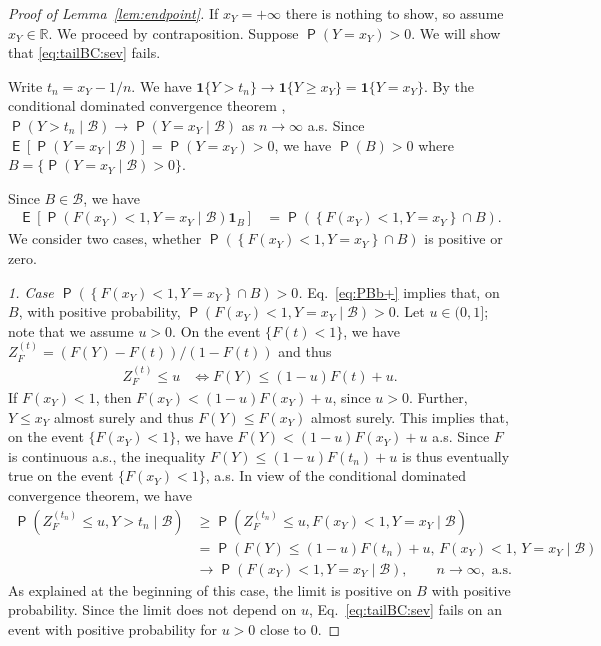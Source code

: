 \documentclass[12pt]{article}
\newcommand{\E}{\operatorname{\mathsf{E}}}
\newcommand{\Q}{\operatorname{\mathsf{P}}}
\newcommand{\R}{\mathbb{R}}
\newcommand{\Bb}{\mathcal{B}}
\newcommand{\1}{\mathbf{1}} %
\newcommand{\ZFt}{Z_{F}^{(t)}} %
\newcommand{\ZFtn}{Z_F^{(t_n)}}
\theoremstyle{definition}
\begin{document}
\begin{proof}[Proof of Lemma~\ref{lem:endpoint}]
	If $x_Y = +\infty$ there is nothing to show, so assume $x_Y \in \R$. We proceed by contraposition. Suppose $\Q(Y = x_Y) > 0$. 
	We will show that \eqref{eq:tailBC:sev} fails.

	Write $t_n = x_Y - 1/n$.
	We have $\1\{Y > t_n\} \to \1\{Y \ge x_Y\} = \1\{Y = x_Y\}$. By the conditional dominated convergence theorem \citep[e.g.][Exercise~8 on page~117]{kallenberg2002foundations}, $\Q(Y > t_n \mid \Bb) \to \Q(Y = x_Y \mid \Bb)$ as $n \to \infty$ a.s.
	Since $\E[\Q(Y = x_Y \mid \Bb)] = \Q(Y = x_Y) > 0$, we have
	$\Q(B) > 0$ where $B = \{ \Q(Y = x_Y \mid \Bb) > 0 \}$.

	Since $B \in \Bb$, we have
	\begin{align}
	\label{eq:PBb+}
	\E \left[ \Q \left( F(x_Y) < 1, Y = x_Y \mid \Bb \right) \1_B \right]
	&= \Q \left( \left\{ F(x_Y) < 1, Y = x_Y \right\} \cap B \right).
	\end{align}
	We consider two cases, whether $\Q \left( \left\{ F(x_Y) < 1, Y = x_Y \right\} \cap B \right)$ is positive or zero.
	
	\emph{1. Case $\Q \left( \left\{ F(x_Y) < 1, Y = x_Y \right\} \cap B \right) > 0$.}
	Eq.~\eqref{eq:PBb+} implies that, on $B$, with positive probability, $\Q \left( F(x_Y) < 1, Y = x_Y \mid \Bb \right) > 0$.
	Let $u \in (0, 1]$; note that we assume $u > 0$.
	On the event $\{F(t) < 1\}$, we have $\ZFt = (F(Y)-F(t))/(1-F(t))$ and thus
	\begin{align*}
		\ZFt \le u
		&\iff
		F(Y) \le (1-u) F(t) + u.
	\end{align*}
	If $F(x_Y) < 1$, then $F(x_Y) < (1-u) F(x_Y) + u$, since $u > 0$. Further, $Y \le x_Y$ almost surely and thus $F(Y) \le F(x_Y)$ almost surely. This implies that, on the event $\{F(x_Y) < 1\}$, we have $F(Y) < (1-u) F(x_Y) + u$ a.s. Since $F$ is continuous a.s., the inequality $F(Y) \le (1-u) F(t_n) + u$ is thus eventually true on the event $\{F(x_Y) < 1\}$, a.s.
	In view of the conditional dominated convergence theorem, we have
	\begin{align*}
		\Q \left( \ZFtn \le u, Y > t_n \mid \Bb \right)
		&\ge \Q \left( 
		\ZFtn \le u, F(x_Y) < 1, Y = x_Y \mid \Bb 
		\right) \\
		&= \Q \left( F(Y) \le (1-u) F(t_n) + u, \, F(x_Y) < 1, \, Y = x_Y \mid \Bb \right) \\
		&\to \Q \left( 
		F(x_Y) < 1, Y = x_Y \mid \Bb 
		\right), \qquad n \to \infty, \text{ a.s.}
	\end{align*}
	As explained at the beginning of this case, the limit is positive on $B$ with positive probability. Since the limit does not depend on $u$, Eq.~\eqref{eq:tailBC:sev} fails on an event with positive probability for $u > 0$ close to $0$.


\end{proof}
\end{document}
